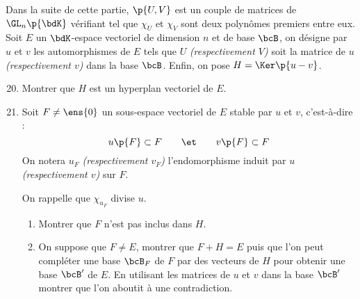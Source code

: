 \documentclass[a4paper,french,bookmarks]{article}
\begin{document}
    Dans la suite de cette partie, $\p{U, V}$ est un couple de matrices de $\GL_n\p{\bdK}$ vérifiant \enumrefraw{(*)} tel que $\chi_U$ et $\chi_V$ sont deux polynômes premiers entre eux. Soit $E$ un $\bdK$-espace vectoriel de dimension $n$ et de base $\bcB$, on désigne par $u$ et $v$ les automorphismes de $E$ tels que $U$ \emph{(respectivement $V$)} soit la matrice de $u$ \emph{(respectivement $v$)} dans la base $\bcB$. Enfin, on pose $H = \Ker\p{u-v}$.
        
    \begin{enumerate}
        \setcounter{enumi}{19}
        \item Montrer que $H$ est un hyperplan vectoriel de $E$.

        
        \item Soit $F \neq \ens{0}$ un sous-espace vectoriel de $E$ stable par $u$ et $v$, c'est-à-dire :
        \[ u\p{F} \subset F \qquad\et\qquad v\p{F} \subset F\]
        On notera $u_F$ \emph{(respectivement $v_F$)} l'endomorphisme induit par $u$ \emph{(respectivement $v$)} sur $F$.
        
        On rappelle que $\chi_{u_F}$ divise $u$.
        
        \begin{enumerate}
            \item Montrer que $F$ n'est pas inclus dans $H$.
            
            
            \item On suppose que $F \neq E$, montrer que $F + H = E$ puis que l'on peut compléter une base $\bcB_F$ de $F$ par des vecteurs de $H$ pour obtenir une base $\bcB'$ de $E$. En utilisant les matrices de $u$ et $v$ dans la base $\bcB'$ montrer que l'on aboutit à une contradiction.
            
\end{enumerate}
\end{enumerate}
\end{document}
